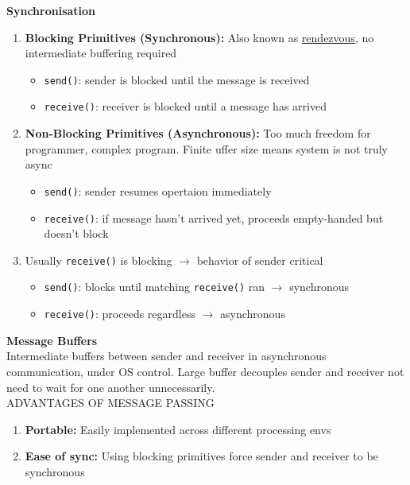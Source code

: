 \documentclass[10pt,landscape]{article}
\begin{document}
\begin{multicols*}{3}
\textbf{Synchronisation} 
\begin{enumerate}[topsep=0pt,noitemsep,wide=0pt, leftmargin=\dimexpr\labelwidth + 2\labelsep\relax]
    \item \textbf{Blocking Primitives (Synchronous):} Also known as \underline{rendezvous}, no intermediate buffering required
        \begin{itemize}[topsep=0pt,noitemsep,wide=0pt, leftmargin=\dimexpr{} + 2\relax]
            \item \verb|send()|: sender is blocked until the message is received
            \item \verb|receive()|: receiver is blocked until a message has arrived
        \end{itemize}
    \item \textbf{Non-Blocking Primitives (Asynchronous):} Too much freedom for programmer, complex program. Finite uffer size means system is not truly async
        \begin{itemize}[topsep=0pt,noitemsep,wide=0pt, leftmargin=\dimexpr{} + 2\relax]
            \item \verb|send()|: sender resumes opertaion immediately
            \item \verb|receive()|: if message hasn't arrived yet, proceeds empty-handed but doesn't block
        \end{itemize}
    \item Usually \verb|receive()| is blocking $\rightarrow$ behavior of sender critical
        \begin{itemize}[topsep=0pt,noitemsep,wide=0pt, leftmargin=\dimexpr{} + 2\relax]
            \item \verb|send()|: blocks until matching \verb|receive()| ran $\rightarrow$ synchronous
            \item \verb|receive()|: proceeds regardless $\rightarrow$ asynchronous
        \end{itemize}
\end{enumerate}

\textbf{Message Buffers} \\ 
Intermediate buffers between sender and receiver in asynchronous communication, under OS control. Large buffer decouples
sender and receiver not need to wait for one another unnecessarily. \\

ADVANTAGES OF MESSAGE PASSING
\begin{enumerate}[topsep=0pt,noitemsep,wide=0pt, leftmargin=\dimexpr\labelwidth + 2\labelsep\relax, topsep=0pt]
    \item \textbf{Portable:} Easily implemented across different processing envs
    \item \textbf{Ease of sync:} Using blocking primitives force sender and receiver to be synchronous
\end{enumerate}


\end{multicols*}
\end{document}
